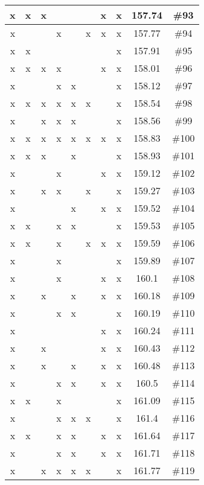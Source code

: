 \begin{center}
\begin{longtable}{|c|c|c|c|c|c|c|c|c|c|}
 x &  x &  x &  &  &  &  x &  x & 157.74 & \#93 \\ \hline
 x &  &  &  x &  &  x &  x &  x & 157.77 & \#94 \\ \hline
 x &  x &  &  &  &  &  &  x & 157.91 & \#95 \\ \hline
 x &  x &  x &  x &  &  &  x &  x & 158.01 & \#96 \\ \hline
 x &  &  &  x &  x &  &  &  x & 158.12 & \#97 \\ \hline
 x &  x &  x &  x &  x &  x &  &  x & 158.54 & \#98 \\ \hline
 x &  &  x &  x &  x &  &  &  x & 158.56 & \#99 \\ \hline
 x &  x &  x &  x &  x &  x &  x &  x & 158.83 & \#100 \\ \hline
 x &  x &  x &  &  x &  &  &  x & 158.93 & \#101 \\ \hline
 x &  &  &  x &  &  &  x &  x & 159.12 & \#102 \\ \hline
 x &  &  x &  x &  &  x &  &  x & 159.27 & \#103 \\ \hline
 x &  &  &  &  x &  &  x &  x & 159.52 & \#104 \\ \hline
 x &  x &  &  x &  x &  &  &  x & 159.53 & \#105 \\ \hline
 x &  x &  &  x &  &  x &  x &  x & 159.59 & \#106 \\ \hline
 x &  &  &  x &  &  &  &  x & 159.89 & \#107 \\ \hline
 x &  &  &  x &  &  &  x &  x & 160.1 & \#108 \\ \hline
 x &  &  x &  &  x &  &  x &  x & 160.18 & \#109 \\ \hline
 x &  &  &  x &  x &  &  &  x & 160.19 & \#110 \\ \hline
 x &  &  &  &  &  &  x &  x & 160.24 & \#111 \\ \hline
 x &  &  x &  &  &  &  x &  x & 160.43 & \#112 \\ \hline
 x &  &  x &  &  x &  &  x &  x & 160.48 & \#113 \\ \hline
 x &  &  &  x &  x &  &  x &  x & 160.5 & \#114 \\ \hline
 x &  x &  &  x &  &  &  &  x & 161.09 & \#115 \\ \hline
 x &  &  &  x &  x &  x &  &  x & 161.4 & \#116 \\ \hline
 x &  x &  &  x &  x &  &  x &  x & 161.64 & \#117 \\ \hline
 x &  &  &  x &  x &  &  x &  x & 161.71 & \#118 \\ \hline
 x &  &  x &  x &  x &  x &  &  x & 161.77 & \#119 \\ \hline

\end{longtable}
\end{center}
